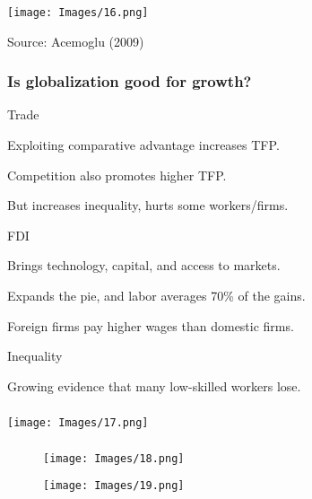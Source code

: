 \documentclass[serif,professionalfont,red,aspectratio=169]{beamer}
\begin{document}
\begin{frame}[t]
\frametitle{}
\begin{center}
\texttt{[image: Images/16.png]}
\end{center}
\small{Source: Acemoglu (2009)}
\end{frame}
\begin{frame}[t]
\frametitle{Is globalization good for growth?}
\textcolor{greens}{Trade}

\vspace{2mm}
\hspace{8mm}Exploiting comparative advantage increases TFP.
\vspace{2mm}

\hspace{8mm}Competition also promotes higher TFP.

\vspace{2mm}
\hspace{8mm}But increases inequality, hurts some workers/firms.

\vspace{4mm}
\textcolor{greens}{FDI}
\vspace{2mm}

\hspace{8mm}Brings technology, capital, and access to markets.
\vspace{2mm}

\hspace{8mm}Expands the pie, and labor averages 70\% of the gains.
\vspace{2mm}

\hspace{8mm}Foreign firms pay higher wages than domestic firms.
\vspace{4mm}

\textcolor{greens}{Inequality}

\vspace{2mm}
\hspace{8mm}Growing evidence that many low-skilled workers lose.
\end{frame}
\begin{frame}[t]
\frametitle{}
\begin{center}
\texttt{[image: Images/17.png]}
\end{center}
\end{frame}
\begin{frame}[t]
\frametitle{}
\begin{figure}
\centering
\begin{minipage}{.5\textwidth}
  \centering
  \texttt{[image: Images/18.png]}
\end{minipage}%
\begin{minipage}{.5\textwidth}
  \centering
  \texttt{[image: Images/19.png]}
\end{minipage}
\end{figure}
\end{frame}
\end{document}

